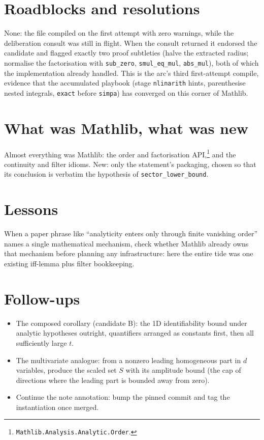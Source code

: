 \documentclass[11pt]{article}
\begin{document}
\section{Roadblocks and resolutions}

None: the file compiled on the first attempt with zero warnings, while the
deliberation consult was still in flight. When the consult returned it
endorsed the candidate and flagged exactly two proof subtleties (halve the
extracted radius; normalise the factorisation with \texttt{sub\_zero},
\texttt{smul\_eq\_mul}, \texttt{abs\_mul}), both of which the
implementation already handled. This is the arc's third first-attempt
compile, evidence that the accumulated playbook (stage \texttt{nlinarith}
hints, parenthesise nested integrals, \texttt{exact} before
\texttt{simpa}) has converged on this corner of Mathlib.

\section{What was Mathlib, what was new}

Almost everything was Mathlib: the order and factorisation
API,\footnote{\texttt{Mathlib.Analysis.Analytic.Order}.} and the
continuity and filter idioms. New: only the statement's packaging, chosen so that its conclusion
is verbatim the hypothesis of \texttt{sector\_lower\_bound}.

\section{Lessons}

When a paper phrase like ``analyticity enters only through finite vanishing
order'' names a single mathematical mechanism, check whether Mathlib
already owns that mechanism before planning any infrastructure: here the
entire tide was one existing iff-lemma plus filter bookkeeping.

\section{Follow-ups}

\begin{itemize}
\item The composed corollary (candidate B): the 1D identifiability bound
under analytic hypotheses outright, quantifiers arranged as constants
first, then all sufficiently large $t$.
\item The multivariate analogue: from a nonzero leading homogeneous part in
$d$ variables, produce the scaled set $S$ with its amplitude bound
(the cap of directions where the leading part is bounded away from zero).
\item Continue the note annotation: bump the pinned commit and tag the
instantiation once merged.
\end{itemize}
\end{document}
